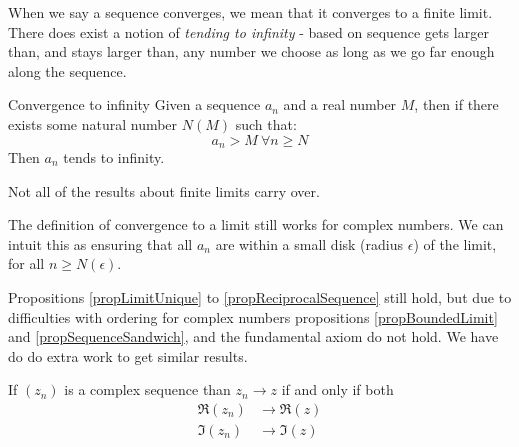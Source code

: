 \documentclass[../Main.tex]{subfiles}
\begin{document}
\begin{remark}
    When we say a sequence converges, we mean that it converges to a finite limit. There does exist a notion of \textit{tending to infinity} - based on sequence gets larger than, and stays larger than, any number we choose as long as we go far enough along the sequence.
\end{remark}
\begin{definition}{Convergence to infinity}
    Given a sequence $a_n$ and a real number $M$, then if there exists some natural number $N(M)$ such that:
    \begin{equation*}
        a_n > M~\forall n \geq N
    \end{equation*}
    Then $a_n$ tends to infinity.
\end{definition}
\begin{warning}
    Not all of the results about finite limits carry over.
\end{warning}
\begin{remark}
    The definition of convergence to a limit still works for complex numbers. We can intuit this as ensuring that all $a_n$ are within a small disk (radius $\epsilon$) of the limit, for all $n \geq N(\epsilon)$.\par
    Propositions \ref{propLimitUnique} to \ref{propReciprocalSequence} still hold, but due to difficulties with ordering for complex numbers propositions \ref{propBoundedLimit} and \ref{propSequenceSandwich}, and the fundamental axiom do not hold. We have do do extra work to get similar results.
\end{remark}
\begin{lemma}
    If $(z_n)$ is a complex sequence than $z_n \rightarrow z$ if and only if both
    \begin{align*}
        \Re(z_n) &\rightarrow \Re(z) \\
        \Im(z_n) &\rightarrow \Im(z)
    \end{align*}
    \label{lemComplexConvergence}
\end{lemma}
\end{document}

